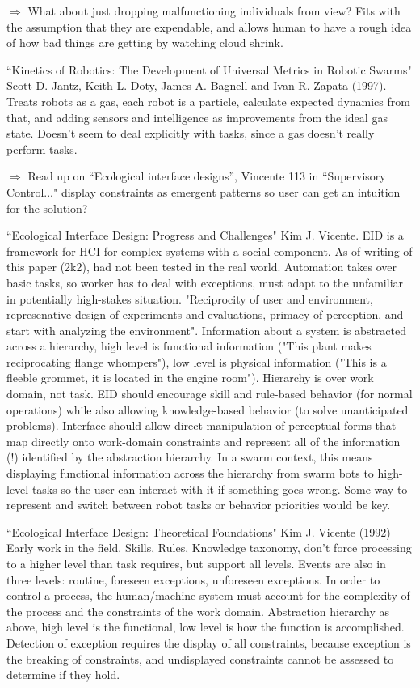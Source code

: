 \documentclass[]{article}
\begin{document}
$\Rightarrow$ What about just dropping malfunctioning individuals from view? Fits with the assumption that they are expendable, and allows human to have a rough idea of how bad things are getting by watching cloud shrink. 


``Kinetics of Robotics: The Development of Universal Metrics in Robotic Swarms" \cite{jantz1997kinetics} Scott D. Jantz, Keith L. Doty, James A. Bagnell and Ivan R. Zapata (1997). Treats robots as a gas, each robot is a particle, calculate expected dynamics from that, and adding sensors and intelligence as improvements from the ideal gas state. Doesn't seem to deal explicitly with tasks, since a gas doesn't really perform tasks. 

$\Rightarrow$ Read up on ``Ecological interface designs'', Vincente 113 in ``Supervisory Control..." display constraints as emergent patterns so user can get an intuition for the solution? 

``Ecological Interface Design: Progress and Challenges" \cite{vicente2002ecological} Kim J. Vicente. EID is a framework for HCI for complex systems with a social component. As of writing of this paper (2k2), had not been tested in the real world. Automation takes over basic tasks, so worker has to deal with exceptions, must adapt to the unfamiliar in potentially high-stakes situation. "Reciprocity of user and environment, represenative design of experiments and evaluations, primacy of perception, and start with analyzing the environment". Information about a system is abstracted across a hierarchy, high level is functional information ("This plant makes reciprocating flange whompers"), low level is physical information ("This is a fleeble grommet, it is located in the engine room"). Hierarchy is over work domain, not task. EID should encourage skill and rule-based behavior (for normal operations) while also allowing knowledge-based behavior (to solve unanticipated problems). Interface should allow direct manipulation of perceptual forms that map directly onto work-domain constraints and represent all of the information (!) identified by the abstraction hierarchy. In a swarm context, this means displaying functional information across the hierarchy from swarm bots to high-level tasks so the user can interact with it if something goes wrong. Some way to represent and switch between robot tasks or behavior priorities would be key. 

``Ecological Interface Design: Theoretical Foundations" \cite{vicente1992ecological} Kim J. Vicente (1992) Early work in the field. Skills, Rules, Knowledge taxonomy, don't force processing to a higher level than task requires, but support all levels. Events are also in three levels: routine, foreseen exceptions, unforeseen exceptions. In order to control a process, the human/machine system must account for the complexity of the process and the constraints of the work domain. Abstraction hierarchy as above, high level is the functional, low level is how the function is accomplished. Detection of exception requires the display of all constraints, because exception is the breaking of constraints, and undisplayed constraints cannot be assessed to determine if they hold. 
\end{document}
